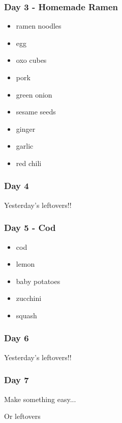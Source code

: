 \documentclass[11pt, a4paper]{article}
\begin{document}
\subsubsection{Day 3 - Homemade Ramen}
\vspace{1pc}
\begin{itemize}
\item ramen noodles
\item egg
\item oxo cubes
\item pork
\item green onion
\item sesame seeds
\item ginger
\item garlic
\item red chili
\end{itemize}

\subsubsection{Day 4}
\vspace{1pc}
Yesterday's leftovers!!

\subsubsection{Day 5 - Cod}
\vspace{1pc}
\begin{itemize}
\item cod
\item lemon
\item baby potatoes
\item zucchini
\item squash
\end{itemize}

\subsubsection{Day 6}
\vspace{1pc}
Yesterday's leftovers!!

\subsubsection{Day 7}
\vspace{1pc}
\noindent Make something easy...
\par
Or leftovers


\vspace{0.917 pc} %
\end{document}
